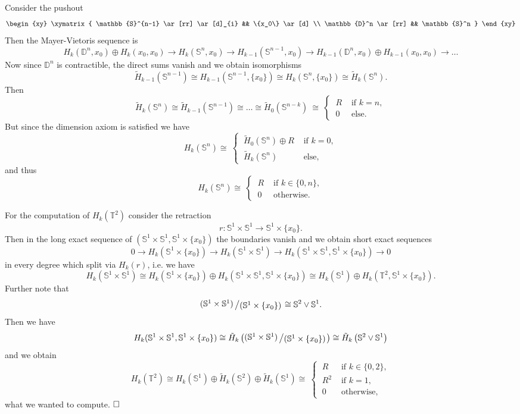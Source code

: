 \documentclass[11pt]{book}
\numberwithin{dummy}{section}
\theoremstyle{nonumberbreak}
\newenvironment{sol}[1][]{\ifthenelse{\equal{#1}{}}{\solution}{\solution[#1]}\rm}{\endsolution}
\newenvironment{prob}[1][]{\ifthenelse{\equal{#1}{}}{\problem}{\problem[#1]}\rm}{\endproblem}
\newcommand{\Sph}{\mathbb{S}}
\newcommand{\la}{\longrightarrow}
\newcommand{\slant}[2]{{\raisebox{.1em}{$#1$}\left/\raisebox{-.1em}{$#2$}\right.}}
\begin{document}
\begin{spacing}{1.4}
\begin{prob}
\begin{sol}
\begin{compactenum}
\item Consider the pushout
$$
\begin{xy}
\xymatrix{
\Sph^{n-1} \ar[rr] \ar[d]_{i} && \{x_0\} \ar[d] \\ \mathbb{D}^n \ar[rr] && \Sph^n
}
\end{xy}
$$
Then the Mayer-Vietoris sequence is
$$H_k(\mathbb{D}^n, x_0) \oplus H_k(x_0, x_0) \rightarrow H_k(\Sph^n, x_0) \rightarrow H_{k-1}(\Sph^{n-1},x_0) \rightarrow H_{k-1}(\mathbb{D}^n, x_0) \oplus H_{k-1}(x_0,x_0) \rightarrow \ldots$$
Now since $\mathbb{D}^n$ is contractible, the direct sums vanish and we obtain isomorphisms
$$\tilde{H}_{k-1}(\Sph^{n-1}) \cong  H_{k-1}(\Sph^{n-1},\{x_0\}) \cong H_k(\Sph^n,\{x_0\}) \cong\tilde{H}_k(\Sph^n).$$
Then 
$$\tilde{H}_k(\Sph^n) \cong \tilde{H}_{k-1}(\Sph^{n-1}) \cong \ldots \cong \tilde{H}_0(\Sph^{n-k}) \ \cong \ \begin{cases} \ R & \textrm{ if } k=n, \\ \ 0 & \textrm{ else.} \end{cases}$$
But since the dimension axiom is satisfied we have
$$H_k(\Sph^n) \cong \ \begin{cases} \ \tilde{H}_0(\Sph^n) \oplus R &\textrm{ if }k=0, \\ \ \tilde{H}_k(\Sph^n) &\textrm{ else,} \end{cases}$$
and thus 
$$H_k(\Sph^n) \cong \ \begin{cases} \ R & \textrm{ if }k \in \{0,n\}, \\  \ 0 & \textrm{ otherwise.}\end{cases}$$
\item For the computation of $H_k(\mathbb{T}^2)$ consider the retraction 
$$r: \Sph^1 \times \Sph^1 \la \Sph^1 \times \{x_0\}.$$
Then in the long exact sequence of $(\Sph^1 \times \Sph^1, \Sph^1 \times \{x_0\})$ the boundaries vanish and we obtain short exact sequences 
$$0 \la H_k(\Sph^1 \times \{x_0\}) \la H_k(\Sph^1 \times \Sph^1) \la H_k(\Sph^1 \times \Sph^1, \Sph^1 \times \{x_0\}) \la 0$$
in every degree which split via $H_k(r)$, i.e. we have 
$$H_k(\Sph^1 \times \Sph^1 ) \cong H_k(\Sph^1 \times \{x_0\}) \oplus H_k(\Sph^1 \times \Sph^1, \Sph^1 \times \{x_0\}) \cong H_k(\Sph^1) \oplus H_k(\mathbb{T}^2, \Sph^1 \times \{x_0\}).$$
Further note that 
$$\slant{(\Sph^1 \times \Sph^1)}{(\Sph^1 \times \{x_0\})} \cong \Sph^2 \vee \Sph^1.$$
Then we have 
$$H_k(\Sph^1 \times \Sph^1, \Sph^1 \times \{x_0\}) \cong \tilde{H}_k\left( \slant{(\Sph^1 \times  \Sph^1)}{(\Sph^1 \times \{x_0\})}\right) \cong \tilde{H}_k\left( \Sph^2 \vee \Sph^1\right)$$
and we obtain 
$$H_k(\mathbb{T}^2) \cong H_k(\Sph^1) \oplus \tilde{H}_k(\Sph^2) \oplus \tilde{H}_k(\Sph^1) \cong \ \begin{cases} \ R& \textrm{ if } k \in \{0,2\}, \\ \ R^2 & \textrm{ if }k=1, \\ \ 0 &\textrm{ otherwise,} \end{cases}$$
what we wanted to compute. $\hfill \Box$
\end{compactenum}
\end{sol}


\end{prob}
\end{spacing}
\end{document}
